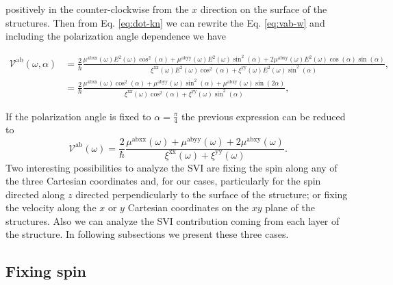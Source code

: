\documentclass[prb,11pt,tightenlines,twocolumn,aps]{revtex4-1}
\begin{document}
positively in the counter-clockwise from the $x$ direction on the
surface of the structures.
% 
Then from Eq. \eqref{eq:dot-kn} we can rewrite the Eq. \eqref{eq:vab-w} and 
including the polarization angle dependence we have
\begin{widetext}
\begin{align}
\mathcal{V}^{\mathrm{ab}}(\omega,\alpha)
&= \frac{2}{\hbar}
\frac{\mu^{\mathrm{abxx}}(\omega)
E^{2}(\omega)\cos^{2}(\alpha) + 
\mu^{\mathrm{abyy}}(\omega)
E^{2}(\omega)\sin^{2}(\alpha) + 
2\mu^{\mathrm{abxy}}(\omega)
E^{2}(\omega)\cos(\alpha)\sin(\alpha)}
{\xi^{\mathrm{xx}}(\omega)
E^{2}(\omega)\cos^{2}(\alpha) + 
\xi^{\mathrm{yy}}(\omega)
E^{2}(\omega)\sin^{2}(\alpha)},
\nonumber \\
&= \frac{2}{\hbar}
\frac{\mu^{\mathrm{abxx}}(\omega)\cos^{2}(\alpha) + 
\mu^{\mathrm{abyy}}(\omega)\sin^{2}(\alpha) + 
\mu^{\mathrm{abxy}}(\omega)\sin(2\alpha)}
{\xi^{\mathrm{xx}}(\omega)\cos^{2}(\alpha) + 
\xi^{\mathrm{yy}}(\omega)\sin^{2}(\alpha)},
\label{eq:vab-aw}
\end{align}
\end{widetext}
% 
If the polarization angle is fixed to $\alpha = \frac{\pi}{4}$ the previous
expression can be reduced to 
\begin{equation*}\label{eq:vab-90deg}
\mathcal{V}^{\mathrm{ab}} (\omega)
= \frac{2}{\hbar}
\frac{\mu^{\mathrm{abxx}}(\omega) + \mu^{\mathrm{abyy}}(\omega) + 
2\mu^{\mathrm{abxy}}(\omega)}
{\xi^{\mathrm{xx}}(\omega) + \xi^{\mathrm{yy}}(\omega)}.
\end{equation*}
Two interesting possibilities to analyze the SVI are fixing the spin along any
of the three Cartesian coordinates and, for our cases, particularly for the
spin directed along $z$ directed perpendicularly to the surface of the
structure; or fixing the velocity along the $x$ or $y$ Cartesian coordinates on
the $xy$ plane of the structures. Also we can analyze the SVI contribution
coming from each layer of the structure. In following subsections we present
these three cases.


\subsection{Fixing spin}\label{sec:theory-fixspin}
\end{document}
